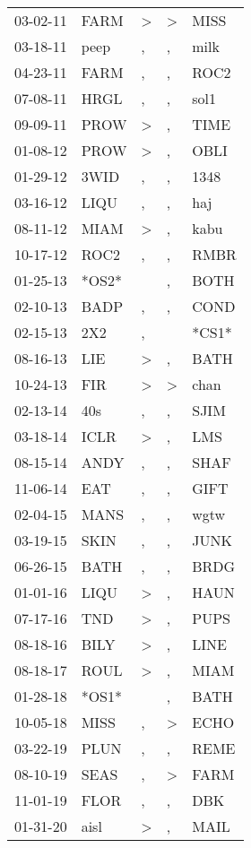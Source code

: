 \begin{supertabular}{lllll}
 03-02-11 &   FARM &  \textgreater &  \textgreater &   MISS \\
 03-18-11 &   peep &             , &             , &   milk \\
 04-23-11 &   FARM &             , &             , &   ROC2 \\
 07-08-11 &   HRGL &             , &             , &   sol1 \\
 09-09-11 &   PROW &  \textgreater &             , &   TIME \\
 01-08-12 &   PROW &  \textgreater &             , &   OBLI \\
 01-29-12 &   3WID &             , &             , &   1348 \\
 03-16-12 &   LIQU &             , &             , &    haj \\
 08-11-12 &   MIAM &  \textgreater &             , &   kabu \\
 10-17-12 &   ROC2 &             , &             , &   RMBR \\
 01-25-13 &  *OS2* &               &             , &   BOTH \\
 02-10-13 &   BADP &             , &             , &   COND \\
 02-15-13 &    2X2 &             , &               &  *CS1* \\
 08-16-13 &    LIE &  \textgreater &             , &   BATH \\
 10-24-13 &    FIR &  \textgreater &  \textgreater &   chan \\
 02-13-14 &    40s &             , &             , &   SJIM \\
 03-18-14 &   ICLR &  \textgreater &             , &    LMS \\
 08-15-14 &   ANDY &             , &             , &   SHAF \\
 11-06-14 &    EAT &             , &             , &   GIFT \\
 02-04-15 &   MANS &             , &             , &   wgtw \\
 03-19-15 &   SKIN &             , &             , &   JUNK \\
 06-26-15 &   BATH &             , &             , &   BRDG \\
 01-01-16 &   LIQU &  \textgreater &             , &   HAUN \\
 07-17-16 &    TND &  \textgreater &             , &   PUPS \\
 08-18-16 &   BILY &  \textgreater &             , &   LINE \\
 08-18-17 &   ROUL &  \textgreater &             , &   MIAM \\
 01-28-18 &  *OS1* &               &             , &   BATH \\
 10-05-18 &   MISS &             , &  \textgreater &   ECHO \\
 03-22-19 &   PLUN &             , &             , &   REME \\
 08-10-19 &   SEAS &             , &  \textgreater &   FARM \\
 11-01-19 &   FLOR &             , &             , &    DBK \\
 01-31-20 &   aisl &  \textgreater &             , &   MAIL \\
\end{supertabular}
